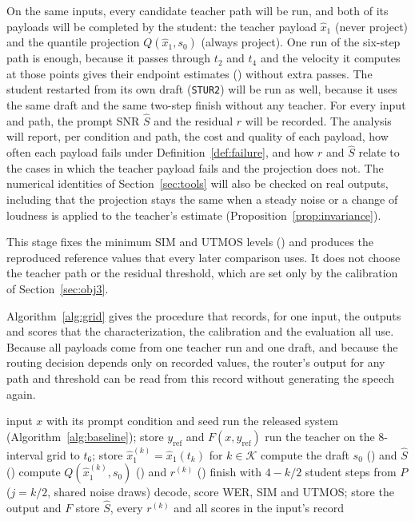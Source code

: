  On the same inputs, every candidate teacher path will be run, and both of its payloads will be completed by the student: the teacher payload $\hat x_1$ (never project) and the quantile projection $Q(\hat x_1,s_0)$ (always project). One run of the six-step path is enough, because it passes through $t_2$ and $t_4$ and the velocity it computes at those points gives their endpoint estimates () without extra passes. The student restarted from its own draft (\texttt{STUR2}) will be run as well, because it uses the same draft and the same two-step finish without any teacher. For every input and path, the prompt SNR $\hat S$ and the residual $r$ will be recorded. The analysis will report, per condition and path, the cost and quality of each payload, how often each payload fails under Definition~\ref{def:failure}, and how $r$ and $\hat S$ relate to the cases in which the teacher payload fails and the projection does not. The numerical identities of Section~\ref{sec:tools} will also be checked on real outputs, including that the projection stays the same when a steady noise or a change of loudness is applied to the teacher's estimate (Proposition~\ref{prop:invariance}).

 This stage fixes the minimum SIM and UTMOS levels () and produces the reproduced reference values that every later comparison uses. It does not choose the teacher path or the residual threshold, which are set only by the calibration of Section~\ref{sec:obj3}.

Algorithm~\ref{alg:grid} gives the procedure that records, for one input, the outputs and scores that the characterization, the calibration and the evaluation all use. Because all payloads come from one teacher run and one draft, and because the routing decision depends only on recorded values, the router's output for any path and threshold can be read from this record without generating the speech again.

\begin{algorithm}[!htbp]
\caption{Recording the outcomes of one input}
\label{alg:grid}
\small
\begin{algorithmic}[1]
\Require input $x$ with its prompt condition and seed
\State run the released system (Algorithm~\ref{alg:baseline}); store $y_{\text{ref}}$ and $F(x,y_{\text{ref}})$
\State run the teacher on the 8-interval grid to $t_6$; store $\hat x_1^{(k)}=\hat x_1(t_k)$ for $k\in\mathcal K$
\State compute the draft $s_0$ () and $\hat S$ () 
  \State compute $Q(\hat x_1^{(k)},s_0)$ () and $r^{(k)}$ () 
    \State finish with $4-k/2$ student steps from $P$ ($j=k/2$, shared noise draws)
    \State decode, score WER, SIM and UTMOS; store the output and $F$
  \EndFor
\EndFor
\State store $\hat S$, every $r^{(k)}$ and all scores in the input's record
\end{algorithmic}
\end{algorithm}

